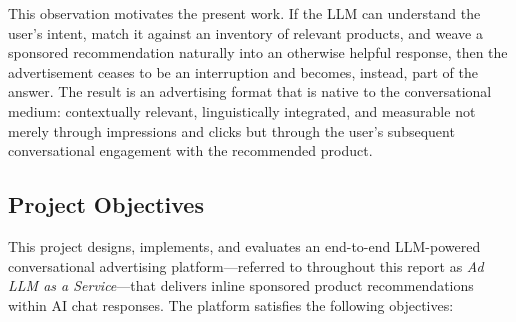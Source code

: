 This observation motivates the present work. If the LLM can understand the
user's intent, match it against an inventory of relevant products, and weave a
sponsored recommendation naturally into an otherwise helpful response, then the
advertisement ceases to be an interruption and becomes, instead, part of the
answer. The result is an advertising format that is native to the conversational
medium: contextually relevant, linguistically integrated, and measurable not
merely through impressions and clicks but through the user's subsequent
conversational engagement with the recommended product.

\subsection{Project Objectives}
\label{subsec:objectives}

This project designs, implements, and evaluates an end-to-end LLM-powered
conversational advertising platform---referred to throughout this report as
\textit{Ad LLM as a Service}---that delivers inline sponsored product
recommendations within AI chat responses. The platform satisfies the following
objectives:

